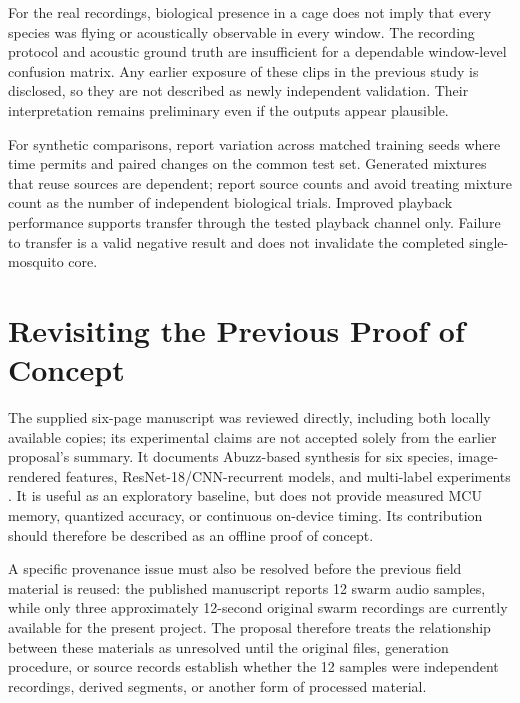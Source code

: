 \documentclass[a4paper,11pt]{article}
\begin{document}
For the real recordings, biological presence in a cage does not imply that every species was flying or acoustically observable in every window. The recording protocol and acoustic ground truth are insufficient for a dependable window-level confusion matrix. Any earlier exposure of these clips in the previous study is disclosed, so they are not described as newly independent validation. Their interpretation remains preliminary even if the outputs appear plausible.

For synthetic comparisons, report variation across matched training seeds where time permits and paired changes on the common test set. Generated mixtures that reuse sources are dependent; report source counts and avoid treating mixture count as the number of independent biological trials. Improved playback performance supports transfer through the tested playback channel only. Failure to transfer is a valid negative result and does not invalidate the completed single-mosquito core.

\section{Revisiting the Previous Proof of Concept}
\label{sec:previous}
The supplied six-page manuscript was reviewed directly, including both locally available copies; its experimental claims are not accepted solely from the earlier proposal's summary. It documents Abuzz-based synthesis for six species, image-rendered features, ResNet-18/CNN-recurrent models, and multi-label experiments \cite{previous}. It is useful as an exploratory baseline, but does not provide measured MCU memory, quantized accuracy, or continuous on-device timing. Its contribution should therefore be described as an offline proof of concept.

A specific provenance issue must also be resolved before the previous field material is reused: the published manuscript reports 12 swarm audio samples, while only three approximately 12-second original swarm recordings are currently available for the present project. The proposal therefore treats the relationship between these materials as unresolved until the original files, generation procedure, or source records establish whether the 12 samples were independent recordings, derived segments, or another form of processed material.
\end{document}
